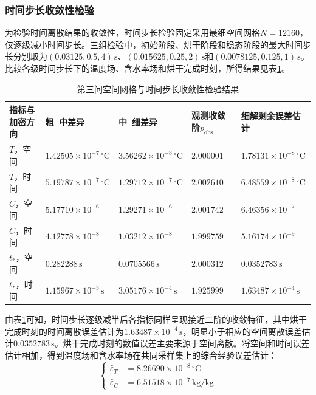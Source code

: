 \documentclass[withoutpreface,bwprint]{cumcmthesis}
\begin{document}
\subsubsection{时间步长收敛性检验}

为检验时间离散结果的收敛性，时间步长检验固定采用最细空间网格$N=12160$，仅逐级减小时间步长。三组检验中，初始阶段、烘干阶段和稳态阶段的最大时间步长分别取为$(0.03125,0.5,4)\,\mathrm s$、$(0.015625,0.25,2)\,\mathrm s$和$(0.0078125,0.125,1)\,\mathrm s$。比较各级时间步长下的温度场、含水率场和烘干完成时刻，所得结果见表\ref{tab:q3-convergence}。

\begin{table}[H]
\centering
\small
\renewcommand{\arraystretch}{1.15}
\caption{第三问空间网格与时间步长收敛性检验结果}
\label{tab:q3-convergence}
\begin{tabularx}{\textwidth}{>{\centering\arraybackslash}p{} >{\centering\arraybackslash}X >{\centering\arraybackslash}X >{\centering\arraybackslash}p{} >{\centering\arraybackslash}X}
\hline
指标与加密方向 & 粗--中差异 & 中--细差异 & 观测收敛阶$p_{\mathrm{obs}}$ & 细解剩余误差估计\\
\hline
$T$，空间 & $1.42505\times10^{-7}\,{}^\circ\mathrm C$ & $3.56262\times10^{-8}\,{}^\circ\mathrm C$ & $2.000001$ & $1.78131\times10^{-8}\,{}^\circ\mathrm C$\\
$T$，时间 & $5.19787\times10^{-7}\,{}^\circ\mathrm C$ & $1.29712\times10^{-7}\,{}^\circ\mathrm C$ & $2.002610$ & $6.48559\times10^{-8}\,{}^\circ\mathrm C$\\
$C$，空间 & $5.17710\times10^{-6}$ & $1.29271\times10^{-6}$ & $2.001742$ & $6.46356\times10^{-7}$\\
$C$，时间 & $4.12778\times10^{-8}$ & $1.03212\times10^{-8}$ & $1.999759$ & $5.16174\times10^{-9}$\\
$t_*$，空间 & $0.282288\,\mathrm s$ & $0.0705566\,\mathrm s$ & $2.000312$ & $0.0352783\,\mathrm s$\\
$t_*$，时间 & $1.15967\times10^{-3}\,\mathrm s$ & $3.05176\times10^{-4}\,\mathrm s$ & $1.925999$ & $1.63487\times10^{-4}\,\mathrm s$\\
\hline
\end{tabularx}
\end{table}

由表\ref{tab:q3-convergence}可知，时间步长逐级减半后各指标同样呈现接近二阶的收敛特征，其中烘干完成时刻的时间离散误差估计为$1.63487\times10^{-4}\,\mathrm s$，明显小于相应的空间离散误差估计$0.0352783\,\mathrm s$。烘干完成时刻的数值误差主要来源于空间离散。将空间和时间误差估计相加，得到温度场和含水率场在共同采样集上的综合经验误差估计：
\begin{equation}
\left\{
\begin{aligned}
\widehat\varepsilon_T&=8.26690\times10^{-8}\,{}^\circ\mathrm C\\
\widehat\varepsilon_C&=6.51518\times10^{-7}\,\mathrm{kg/kg}
\end{aligned}
\right.
\label{eq:q3-field-error-estimates}
\end{equation}
\end{document}
